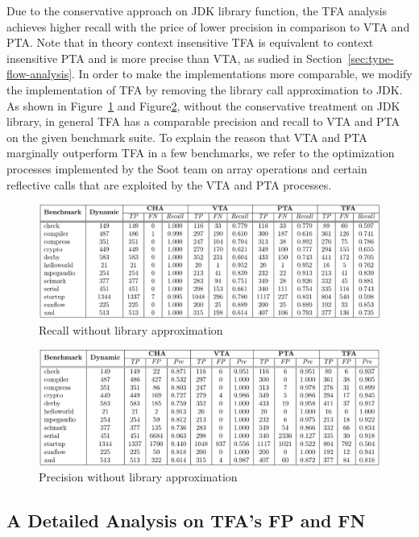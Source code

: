 \documentclass{fac}
\begin{document}
Due to the conservative approach on JDK library function, the TFA analysis achieves higher recall with the price of lower precision in comparison to VTA and PTA. Note that in theory context insensitive TFA is equivalent to context insensitive PTA and is more precise than VTA, as sudied in Section~\ref{sec:type-flow-analysis}. In order to make the implementations more comparable, we modify the implementation of TFA by removing the library call approximation to JDK. As shown in Figure~\ref{fig:nolib-recall} and Figure\ref{fig:nolib-precision}, without the conservative treatment on JDK library, in general TFA has a comparable precision and recall to VTA and PTA on the given benchmark suite. To explain the reason that VTA and PTA marginally outperform TFA in a few benchmarks, we refer to the optimization processes implemented by the Soot team on array operations and certain reflective calls that are exploited by the VTA and PTA processes.

\begin{figure}\centering
\includegraphics[scale=0.9]{recall-no-lib.pdf}
\caption{Recall without library approximation}
\label{fig:nolib-recall}
\end{figure}

\begin{figure}\centering
\includegraphics[scale=0.9]{precision-no-lib.pdf}
\caption{Precision without library approximation}
\label{fig:nolib-precision}
\end{figure}

\subsection{A Detailed Analysis on TFA's FP and FN}\label{subsec:analysis}
\end{document}
